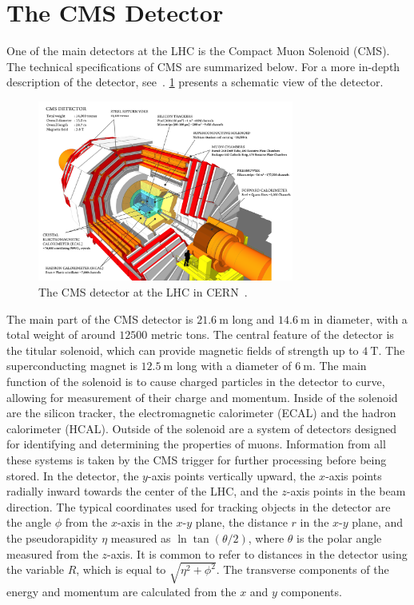 \section{The CMS Detector}
One of the main detectors at the LHC is the Compact Muon Solenoid (CMS). The technical specifications of CMS are summarized below. For a more in-depth description of the detector, see~\cite{Collaboration_2008}. \cref{fig:cms} presents a schematic view of the detector.

\begin{figure}[ht]
    \centering
    \includegraphics[width=0.75\textwidth]{Chapters/CMS/cms_160312_02.png}
    \caption{The CMS detector at the LHC in CERN~\cite{Sakuma_2014,Sakuma:2665537}.}
    \label{fig:cms}
\end{figure}

The main part of the CMS detector is $\SI{21.6}{\m}$ long and $\SI{14.6}{\m}$ in diameter, with a total weight of around $12500$ metric tons. The central feature of the detector is the titular solenoid, which can provide magnetic fields of strength up to $\SI{4}{\tesla}$. The superconducting magnet is $\SI{12.5}{\m}$ long with a diameter of $\SI{6}{\m}$. The main function of the solenoid is to cause charged particles in the detector to curve, allowing for measurement of their charge and momentum. Inside of the solenoid are the silicon tracker, the electromagnetic calorimeter (ECAL) and the hadron calorimeter (HCAL). Outside of the solenoid are a system of detectors designed for identifying and determining the properties of muons. Information from all these systems is taken by the CMS trigger for further processing before being stored. 
In the detector, the $y$-axis points vertically upward, the $x$-axis points radially inward towards the center of the LHC, and the $z$-axis points in the beam direction. The typical coordinates used for tracking objects in the detector are the angle $\phi$ from the $x$-axis in the $x$-$y$ plane, the distance $r$ in the $x$-$y$ plane, and the pseudorapidity $\eta$ measured as $\ln\tan(\theta/2)$, where $\theta$ is the polar angle measured from the $z$-axis.
It is common to refer to distances in the detector using the variable $R$, which is equal to $\sqrt{\eta^2+\phi^2}$.
The transverse components of the energy and momentum are calculated from the $x$ and $y$ components.

